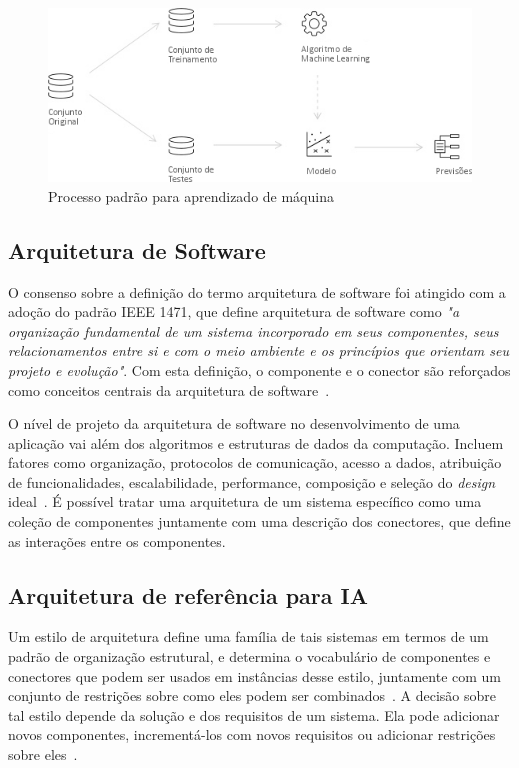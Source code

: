 \documentclass[Portugues,Final]{ic-tese-v3}
\begin{document}
\begin{figure}[h]
\centering
\includegraphics[scale=0.6]{images/ML_Process.jpg}
\caption {Processo padrão para aprendizado de máquina}
\label{fig:MLProcess}
\end{figure}

\subsection{Arquitetura de Software}

O consenso sobre a definição do termo arquitetura de software foi atingido com a adoção do padrão IEEE 1471, que define arquitetura de software como \textit{"a organização fundamental de um sistema incorporado em seus componentes, seus relacionamentos entre si e com o meio ambiente e os princípios que orientam seu projeto e evolução"}. Com esta definição, o componente e o conector são reforçados como conceitos centrais da arquitetura de software~\cite{Bosch_2004}.

O nível de projeto da arquitetura de software no desenvolvimento de uma aplicação vai além dos algoritmos e estruturas de dados da computação. Incluem fatores como organização, protocolos de comunicação, acesso a dados, atribuição de funcionalidades, escalabilidade, performance, composição e seleção do \textit{design} ideal~\cite{Garlan_1993}. É possível tratar uma arquitetura de um sistema específico como uma coleção de componentes juntamente com uma descrição dos conectores, que define as interações entre os componentes.

\subsection{Arquitetura de referência para IA}

Um estilo de arquitetura define uma família de tais sistemas em termos de um padrão de organização estrutural, e determina o vocabulário de componentes e conectores que podem ser usados em instâncias desse estilo, juntamente com um conjunto de restrições sobre como eles podem ser combinados~\cite{Garlan_1993}. A decisão sobre tal estilo depende da solução e dos requisitos de um sistema. Ela pode adicionar novos componentes, incrementá-los com novos requisitos ou adicionar restrições sobre eles~\cite{Bosch_2004}.
\end{document}
